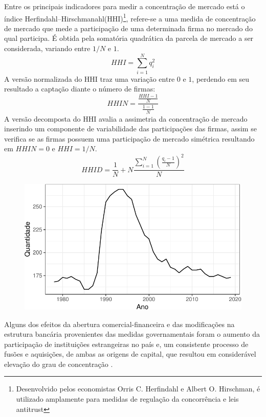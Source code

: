 \documentclass[12pt,12pt,openright,oneside,a4paper,chapter=TITLE,section=TITLE,subsection=TITLE,subsubsection=TITLE,english,french,spanish,portugues,sumario=tradicional]{abntex2}
\begin{document}
Entre os principais indicadores para medir a concentração de mercado está o índice Herfindahl--Hirschmanahl(HHI)\footnote{Desenvolvido pelos economistas Orris C. Herfindahl e Albert O. Hirschman, é utilizado amplamente para medidas de regulação da concorrência e leis antitrust}, refere-se a uma medida de concentração de mercado que mede a participação de uma determinada firma no mercado do qual participa. É obtida pela somatória quadrática da parcela de mercado a ser considerada, variando entre \(1/N\) e \(1\).
\[
HHI = \sum_{i=1}^{N}q_i^2
\]
A versão normalizada do HHI traz uma variação entre \(0\) e \(1\), perdendo em seu resultado a captação diante o número de firmas:
\[
HHIN = \frac{\frac{HHI - 1}{N}}{\frac{1-1}{N}}
\]
A versão decomposta do HHI avalia a assimetria da concentração de mercado inserindo um componente de variabilidade das participações das firmas, assim se verifica se as firmas possuem uma participação de mercado simétrica resultando em \(HHIN = 0\) e \(HHI= 1/N\).
\[
HHID = \frac{1}{N} + N\frac{\sum_{i=1}^{N}(\frac{q_i - 1}{N})^2}{N}
\]

\begin{figure}

\begin{center}\includegraphics{12-exportedfigures/concetration-1} \end{center}
\label{fig:concentracao}
\end{figure}

Alguns dos efeitos da abertura comercial-financeira e das modificações na
estrutura bancária provenientes das medidas governamentais foram o aumento da
participação de instituições estrangeiras no país e, um consistente processo de
fusões e aquisições, de ambas as origens de capital, que resultou em
considerável elevação do grau de concentração \cite{camargo:2009}.
\end{document}
